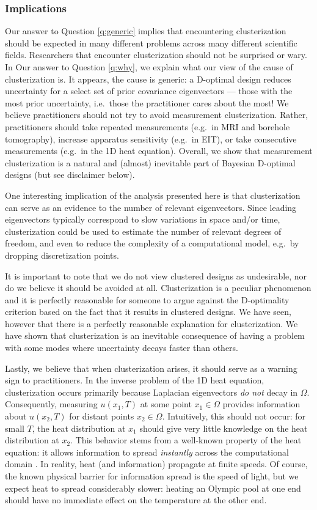 \subsubsection{Implications}
Our answer to Question \ref{q:generic} implies that encountering
clusterization should be expected in many different problems across
many different scientific fields. Researchers that encounter
clusterization should not be surprised or wary. In Our answer to
Question \ref{q:why}, we explain what our view of the cause of
clusterization is. It appears, the cause is generic: a D-optimal
design reduces uncertainty for a select set of prior covariance
eigenvectors --- those with the most prior uncertainty, i.e.~those the
practitioner cares about the most! We believe practitioners should not
try to avoid measurement clusterization. Rather, practitioners should
take repeated measurements (e.g.~in MRI and borehole tomography),
increase apparatus sensitivity (e.g.~in EIT), or take consecutive
measurements (e.g.~in the 1D heat equation). Overall, we show that
measurement clusterization is a natural and (almost) inevitable part
of Bayesian D-optimal designs (but see disclaimer below).

One interesting implication of the analysis presented here is that
clusterization can serve as an evidence to the number of relevant
eigenvectors. Since leading eigenvectors typically correspond to slow
variations in space and/or time, clusterization could be used to
estimate the number of relevant degrees of freedom, and even to reduce
the complexity of a computational model, e.g.~by dropping
discretization points.

It is important to note that we do not view clustered designs as
undesirable, nor do we believe it should be avoided at
all. Clusterization is a peculiar phenomenon and it is perfectly
reasonable for someone to argue against the D-optimality criterion
based on the fact that it results in clustered designs. We have seen,
however that there is a perfectly reasonable explanation for
clusterization. We have shown that clusterization is an inevitable
consequence of having a problem with some modes where uncertainty
decays faster than others.

Lastly, we believe that when clusterization arises, it should serve as
a warning sign to practitioners. In the inverse problem of the 1D heat
equation, clusterization occurs primarily because Laplacian
eigenvectors \emph{do not} decay in $\Omega$. Consequently, measuring
$u(x_1, T)$ at some point $x_1 \in \Omega$ provides information about
$u(x_2,T)$ for distant points $x_2 \in \Omega$. Intuitively, this
should not occur: for small $T$, the heat distribution at $x_1$ should
give very little knowledge on the heat distribution at $x_2$. This
behavior stems from a well-known property of the heat equation: it
allows information to spread \emph{instantly} across the computational
domain \cite{renardy2006PDE}. In reality, heat (and information)
propagate at finite speeds. Of course, the known physical barrier for
information spread is the speed of light, but we expect heat to spread
considerably slower: heating an Olympic pool at one end should have no
immediate effect on the temperature at the other end.

